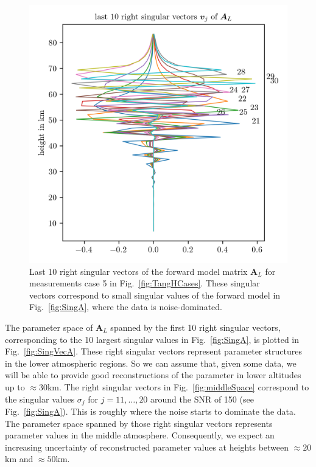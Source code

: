 \begin{figure}[ht!]
	\centering
	\includegraphics{NullVecA.png}
	\caption[Last 10 right singular vectors of forward model.]{Last 10 right singular vectors of the forward model matrix $\bm{A}_L$ for measurements case 5 in Fig.~\ref{fig:TangHCases}. These singular vectors correspond to small singular values of the forward model in Fig.~\ref{fig:SingA}, where the data is noise-dominated.}
	\label{fig:nullSpace}
\end{figure}
The parameter space of $\bm{A}_L$ spanned by the first 10 right singular vectors, corresponding to the 10 largest singular values in Fig.~\ref{fig:SingA}, is plotted in Fig.~\ref{fig:SingVecA}.
These right singular vectors represent parameter structures in the lower atmospheric regions.
So we can assume that, given some data, we will be able to provide good reconstructions of the parameter in lower altitudes up to $\approx30$km.
The right singular vectors in Fig.~\ref{fig:middleSpace} correspond to the singular values $\sigma_j$ for $j = 11, \dots, 20$ around the SNR of 150 (see Fig.~\ref{fig:SingA}).
This is roughly where the noise starts to dominate the data.
The parameter space spanned by those right singular vectors represents parameter values in the middle atmosphere.
Consequently, we expect an increasing uncertainty of reconstructed parameter values at heights between $\approx20$km and $\approx50$km.
